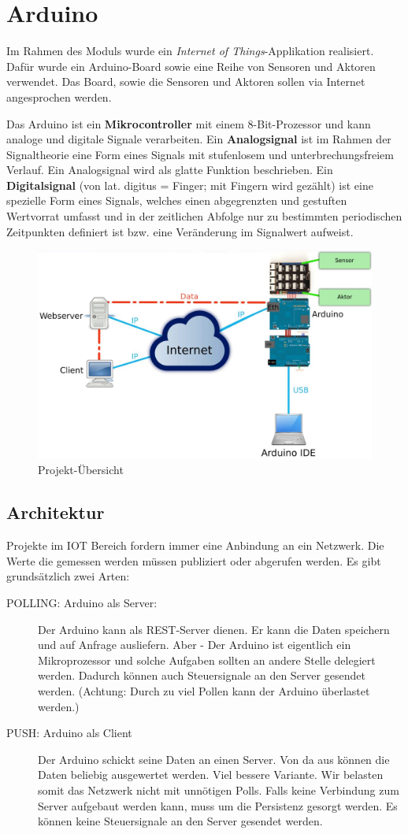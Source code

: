 \chapter{Arduino}
Im Rahmen des Moduls wurde ein \emph{Internet of Things}-Applikation realisiert. Dafür wurde ein Arduino-Board sowie eine Reihe von Sensoren und Aktoren verwendet. Das Board, sowie die Sensoren und Aktoren sollen via Internet angesprochen werden.

Das Arduino ist ein \textbf{Mikrocontroller} mit einem 8-Bit-Prozessor und kann analoge und digitale Signale verarbeiten. Ein \textbf{Analogsignal} ist im Rahmen der Signaltheorie eine Form eines Signals mit stufenlosem und unterbrechungsfreiem Verlauf. Ein Analogsignal wird als glatte Funktion beschrieben. Ein \textbf{Digitalsignal} (von lat. digitus = Finger; mit Fingern wird gezählt) ist eine spezielle Form eines Signals, welches einen abgegrenzten und gestuften Wertvorrat umfasst und in der zeitlichen Abfolge nur zu bestimmten periodischen Zeitpunkten definiert ist bzw. eine Veränderung im Signalwert aufweist.

\begin{figure}[h!]
\centering
\includegraphics[width=0.7\linewidth]{fig/aruduino-projekt}
\caption{Projekt-Übersicht}
\label{fig:aruduino-projekt}
\end{figure}

\section{Architektur}
Projekte im IOT Bereich fordern immer eine Anbindung an ein Netzwerk. Die Werte die gemessen werden müssen publiziert oder abgerufen werden. Es gibt grundsätzlich zwei Arten:
\begin{description}
	\item[POLLING: Arduino als Server:] Der Arduino kann als REST-Server dienen. Er kann die Daten speichern und auf Anfrage ausliefern. Aber - Der Arduino ist eigentlich ein Mikroprozessor und solche Aufgaben sollten an andere Stelle delegiert werden. Dadurch können auch Steuersignale an den Server gesendet werden. (Achtung: Durch zu viel Pollen kann der Arduino überlastet werden.)
	\item[PUSH: Arduino als Client] Der Arduino schickt seine Daten an einen Server. Von da aus können die Daten beliebig ausgewertet werden. Viel bessere Variante. Wir belasten somit das Netzwerk nicht mit unnötigen Polls. Falls keine Verbindung zum Server aufgebaut werden kann, muss um die Persistenz gesorgt werden. Es können keine Steuersignale an den Server gesendet werden.
\end{description}

